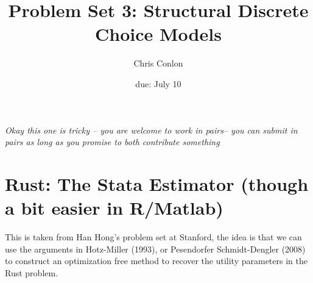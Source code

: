 \documentclass[11pt,letterpaper]{article}
\title{Problem Set 3: Structural Discrete Choice Models}
\author{Chris Conlon }
\begin{document}
\date{due: July 10}
\maketitle

\textit{Okay this one is tricky -- you are welcome to work in pairs-- you can submit in pairs as long as you promise to both contribute something}

\section*{Rust: The Stata Estimator (though a bit easier in R/Matlab)}
This is taken from Han Hong's problem set at Stanford, the idea is that we can use the arguments in Hotz-Miller (1993), or Pesendorfer Schmidt-Dengler (2008) to construct an optimization free method to recover the utility parameters in the Rust problem.\\
\end{document}
